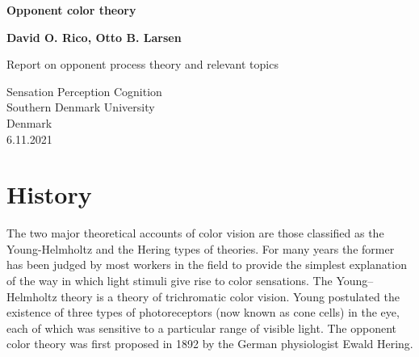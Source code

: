\documentclass[a4paper,12pt,titlepage, oneside]{article}
\begin{document}
\begin{titlepage}
    \begin{center}
        \vspace*{1cm}
            
        \Huge
        \textbf{Opponent color theory}
            
        \vspace{0.5cm}
        \LARGE
            
        \vspace{1.5cm}
            
        \textbf{David O. Rico, Otto B. Larsen}
            
        \vfill
            
        Report on opponent process theory and relevant topics\\
        
            
        \vspace{0.8cm}
        
            
        \Large
        Sensation Perception Cognition\\
        Southern Denmark University\\
        Denmark\\
        6.11.2021
            
    \end{center}
\end{titlepage}

\section{History}
The two major theoretical accounts
of color vision are those classified as
the Young-Helmholtz and the Hering
types of theories. For many years the
former has been judged by most workers  
in the field to provide the simplest
explanation of the way in which light
stimuli give rise to color sensations. \cite{hurvich1957opponent}
The Young–Helmholtz theory is a 
theory of trichromatic color vision.
Young postulated the existence of 
three types of photoreceptors (now known as cone cells) 
in the eye, each of which was sensitive 
to a particular range of visible light.\cite{trichromatic}
The opponent color theory was first proposed in 1892 by 
the German physiologist Ewald Hering.
\end{document}
